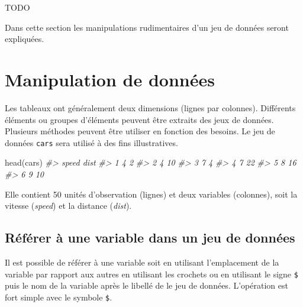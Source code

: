 \documentclass[
]{book}
\newenvironment{Shaded}{}{}
\newcommand{\CommentTok}[1]{\textit{#1}}
\newcommand{\FunctionTok}[1]{#1}
\newcommand{\NormalTok}[1]{#1}
\newcommand{\SpecialCharTok}[1]{#1}
\begin{document}
TODO

Dans cette section les manipulations rudimentaires d'un jeu de données seront expliquées.

\hypertarget{manipulation-de-donnuxe9es}{%
\section{Manipulation de données}\label{manipulation-de-donnuxe9es}}

Les tableaux ont généralement deux dimensions (lignes par colonnes). Différents éléments ou groupes d'éléments peuvent être extraits des jeux de données. Plusieurs méthodes peuvent être utiliser en fonction des besoins. Le jeu de données \texttt{cars} sera utilisé à des fins illustratives.

\begin{Shaded}
\begin{Highlighting}[]
\FunctionTok{head}\NormalTok{(cars)}
\CommentTok{\#\textgreater{}   speed dist}
\CommentTok{\#\textgreater{} 1     4    2}
\CommentTok{\#\textgreater{} 2     4   10}
\CommentTok{\#\textgreater{} 3     7    4}
\CommentTok{\#\textgreater{} 4     7   22}
\CommentTok{\#\textgreater{} 5     8   16}
\CommentTok{\#\textgreater{} 6     9   10}
\end{Highlighting}
\end{Shaded}

Elle contient 50 unités d'observation (lignes) et deux variables (colonnes), soit la vitesse (\emph{speed}) et la distance (\emph{dist}).

\hypertarget{ruxe9fuxe9rer-uxe0-une-variable-dans-un-jeu-de-donnuxe9es}{%
\subsection{Référer à une variable dans un jeu de données}\label{ruxe9fuxe9rer-uxe0-une-variable-dans-un-jeu-de-donnuxe9es}}

Il est possible de référer à une variable soit en utilisant l'emplacement de la variable par rapport aux autres en utilisant les crochets ou en utilisant le signe \texttt{\$} puis le nom de la variable après le libellé de le jeu de données. L'opération est fort simple avec le symbole \texttt{\$}.

\begin{Shaded}
\end{Shaded}
\end{document}
